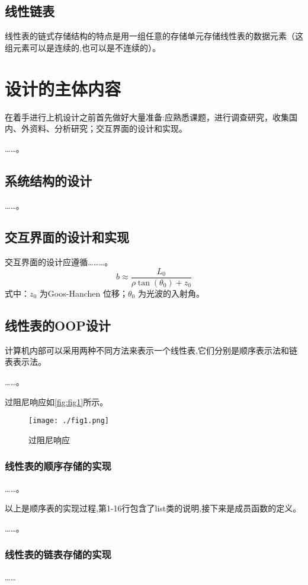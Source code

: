 \documentclass{upcthesis}
\begin{document}
\subsection{线性链表}
	线性表的链式存储结构的特点是用一组任意的存储单元存储线性表的数据元素（这组元素可以是连续的,也可以是不连续的）。

\section{设计的主体内容}
在着手进行上机设计之前首先做好大量准备:应熟悉课题，进行调查研究，收集国内、外资料、分析研究；交互界面的设计和实现。

……。
\subsection{系统结构的设计}
	……。
\subsection{交互界面的设计和实现}
	交互界面的设计应遵循………。
	\begin{equation}
		b \approx \frac{L_0}{\rho\tan(\theta_0) + z_0}
	\end{equation}
式中：$z_0$ 为Goos-Hanchen 位移；$\theta_0$ 为光波的入射角。
\subsection{线性表的OOP设计}
	计算机内部可以采用两种不同方法来表示一个线性表,它们分别是顺序表示法和链表表示法。
	
	……。
	
	过阻尼响应如\autoref{fig:fig1}所示。
	\begin{figure}[htbp]
		\centering
		\texttt{[image: ./fig1.png]}
		\caption{过阻尼响应}
		\label{fig:fig1}
	\end{figure}

\subsubsection{线性表的顺序存储的实现}
……。

以上是顺序表的实现过程,第1-16行包含了list类的说明,接下来是成员函数的定义。

……。

\subsubsection{线性表的链表存储的实现}
……
\end{document}
